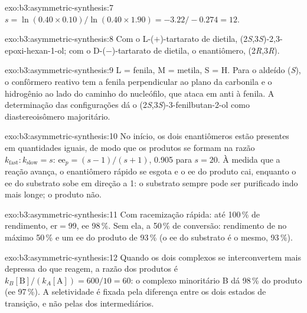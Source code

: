 \begin{solution}{exo:b3:asymmetric-synthesis:7}
$s = \ln(0.40 \times 0.10)/\ln(0.40 \times 1.90) = -3.22/-0.274 = 12$.
\end{solution}

\begin{solution}{exo:b3:asymmetric-synthesis:8}
Com o L-($+$)-tartarato de dietila, (2\textit{S},3\textit{S})-2,3-epoxi-hexan-1-ol; com o D-($-$)-tartarato de dietila, o
enantiômero, (2\textit{R},3\textit{R}).
\end{solution}

\begin{solution}{exo:b3:asymmetric-synthesis:9}
L = fenila, M = metila, S = H. Para o aldeído (\textit{S}), o confôrmero reativo tem a fenila
perpendicular ao plano da carbonila e o hidrogênio ao lado do caminho do
nucleófilo, que ataca em anti à fenila. A determinação das configurações dá
o (2\textit{S},3\textit{S})-3-fenilbutan-2-ol como diastereoisômero majoritário.
\end{solution}

\begin{solution}{exo:b3:asymmetric-synthesis:10}
No início, os dois enantiômeros estão presentes em quantidades iguais, de modo que os produtos
se formam na razão $k_{\mathrm{fast}} : k_{\mathrm{slow}} = s$: $\mathrm{ee}_p = (s - 1)/(s + 1)$, 0.905 para $s = 20$. À medida que a reação avança, o
enantiômero rápido se esgota e o ee do produto cai, enquanto o ee do substrato sobe
em direção a 1: o substrato sempre pode ser purificado indo mais longe; o produto
não.
\end{solution}

\begin{solution}{exo:b3:asymmetric-synthesis:11}
Com racemização rápida: até 100\,\% de rendimento, $\mathrm{er} = 99$, ee 98\,\%. Sem ela, a 50\,\% de
conversão: rendimento de no máximo 50\,\% e um ee do produto de 93\,\% (o ee do substrato é o
mesmo, 93\,\%).
\end{solution}

\begin{solution}{exo:b3:asymmetric-synthesis:12}
Quando os dois complexos se interconvertem mais depressa do que reagem, a razão dos produtos é
$k_B[\mathrm B]/(k_A[\mathrm A]) = 600/10 = 60$: o complexo minoritário B dá 98\,\% do produto (ee 97\,\%). A
seletividade é fixada pela diferença entre os dois estados de transição, e não pelas
 dos intermediários.
\end{solution}

